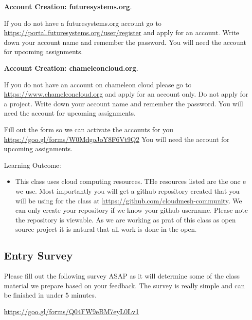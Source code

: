 \begin{exercise}

  {\bf Account Creation: futuresystems.org}. 
  
  If you do not have a
  futuresystems.org account go to
  \url{https://portal.futuresystems.org/user/register} and apply for an
  account. Write down your account name and remember the password. You
  will need the account for upcoming assignments.

\end{exercise}

\begin{exercise}
  {\bf Account Creation: chameleoncloud.org}. 
  
  If you do not have an account on chameleon cloud please go to 
  \url{https://www.chameleoncloud.org} and apply for an
  account only. Do not apply for a project. Write down your account
  name and remember the password. You will need the account for
  upcoming assignments.
\end{exercise}

\begin{exercise}
Fill out the form so we can activate the accounts for you
\url{https://goo.gl/forms/W0MdgoJoY8F6Vt9Q2}
You will need the account for
  upcoming assignments.
\end{exercise}


Learning Outcome:
\begin{itemize}
\item This class uses cloud computing resources. THe resources listed
  are the onc e we use. Most importantly you will get a github
  repository created that you will be using for the class at
  \url{https://github.com/cloudmesh-community}. We can only create
  your repository if we know your github username. Please note the
  repository is viewable. As we are working as prat of this class as
  open source project it is natural that all work is done in the open.
\end{itemize}




\subsection{Entry Survey}
\label{a:survey-entry}
\begin{exercise}
Please fill out the following survey ASAP as it will determine some of the class material we prepare based on your feedback. The survey is really simple and can be finished in under 5 minutes.

\url{https://goo.gl/forms/Q04FW9eBM7eyL0Lv1}
\end{exercise}

